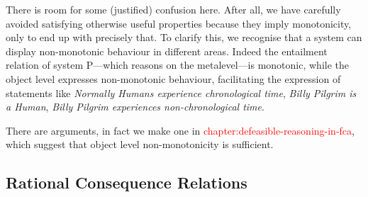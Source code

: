 There is room for some (justified) confusion here. After all, we have carefully avoided satisfying otherwise useful properties
because they imply monotonicity, only to end up with precisely that. To clarify this, we recognise that a system can
display non-monotonic behaviour in different areas. Indeed the entailment relation of system P---which reasons on the metalevel---is
monotonic, while the object level expresses non-monotonic behaviour, facilitating the expression of statements like \textit{Normally
	Humans experience chronological time}, \textit{Billy Pilgrim is a Human}, \textit{Billy Pilgrim experiences non-chronological
	time}.

There are arguments, in fact we make one in \textcolor{red}{chapter:defeasible-reasoning-in-fca}, which suggest that object
level non-monotonicity is sufficient.





\subsection{Rational Consequence Relations}
\label{subsection:rational-consequence-relations}

